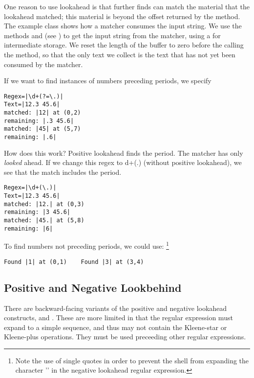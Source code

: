 One reason to use lookahead is that further finds can match
the material that the lookahead matched; this material is beyond
the offset returned by the  method.
The example class  shows how a matcher consumes
the input string.
%
%
%
We use the methods  and 
(see ) to get the input string from the
matcher, using a  for intermediate storage.
We reset the length of the buffer to zero before the calling the
 method, so that the only text we collect is the
text that has not yet been consumed by the matcher.

If we want to find instances of numbers preceding periods, we specify
%
\begin{verbatim}
Regex=|\d+(?=\.)|
Text=|12.3 45.6|
matched: |12| at (0,2)
remaining: |.3 45.6|
matched: |45| at (5,7)
remaining: |.6|
\end{verbatim}
%
How does this work?
Positive lookahead finds the period.  The matcher has only \emph{looked} ahead.
If we change this regex to \code{\bk}d+({\bk}.) (without positive lookahead),
we see that the match includes the period.
%
\begin{verbatim}
Regex=|\d+(\.)|
Text=|12.3 45.6|
matched: |12.| at (0,3)
remaining: |3 45.6|
matched: |45.| at (5,8)
remaining: |6|
\end{verbatim}

To find numbers not preceding periods, we could use:%
%
\footnote{Note the use of single quotes in order to prevent the shell from expanding the character '\code{!}' in the negative lookahead regular expression.}
%
%
\begin{verbatim}
Found |1| at (0,1)    Found |3| at (3,4)
\end{verbatim}

\subsection{Positive and Negative Lookbehind}\label{section:regex-lookbehind}

There are backward-facing variants of the positive and negative
lookahead constructs,  and 
.  These are more limited in that the
regular expression  must expand to a simple sequence, and
thus may not contain the Kleene-star or Kleene-plus operations.
They must be used preceeding other regular expressions.

